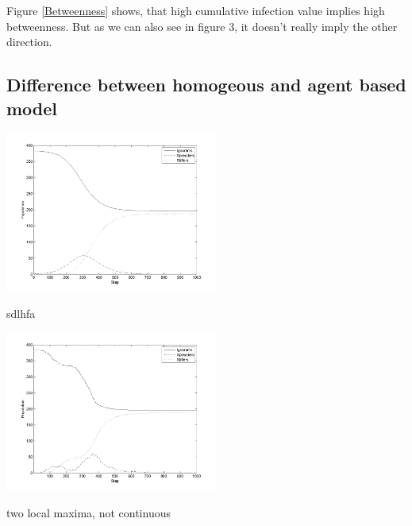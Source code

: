 Figure \ref{Betweenness} shows, that high cumulative infection value implies high betweenness. But as we can also see in figure 3, it doesn't really imply the other direction.

\subsection{Difference between homogeous and agent based model}

\begin{minipage}{0.5\textwidth}
\includegraphics[width=7cm]{NICE_SIR}
\caption{sdlhfa}
\label{NICE_SIR}

\end{minipage}
\begin{minipage}{0.5\textwidth}
\includegraphics[width=7cm]{2-local-max}
\caption{two local maxima, not continuous}
\label{2-local-max}
\end{minipage}

